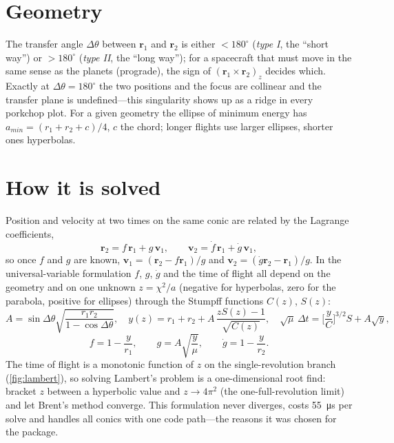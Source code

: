 \documentclass[11pt,letterpaper,oneside]{report}
\newcommand{\bv}[1]{\bm{#1}}
\begin{document}
\section{Geometry}
The transfer angle $\Delta\theta$ between $\bv r_1$ and $\bv r_2$ is either $<180^\circ$
(\emph{type I}, the ``short way'') or $>180^\circ$ (\emph{type II}, the ``long way''); for a
spacecraft that must move in the same sense as the planets (prograde), the sign of
$(\bv r_1\times\bv r_2)_z$ decides which. Exactly at $\Delta\theta=180^\circ$ the two positions and
the focus are collinear and the transfer plane is undefined---this singularity shows up as a
ridge in every porkchop plot. For a given geometry the ellipse of minimum energy has
$a_{min}=(r_1+r_2+c)/4$, $c$ the chord; longer flights use larger ellipses, shorter ones
hyperbolas.

\section{How it is solved}
Position and velocity at two times on the same conic are related by the Lagrange coefficients,
\begin{equation}
  \bv r_2=f\,\bv r_1+g\,\bv v_1,\qquad \bv v_2=\dot f\,\bv r_1+\dot g\,\bv v_1,
\end{equation}
so once $f$ and $g$ are known, $\bv v_1=(\bv r_2-f\bv r_1)/g$ and $\bv v_2=(\dot g\bv r_2-\bv r_1)/g$.
In the universal-variable formulation $f$, $g$, $\dot g$ and the time of flight all depend on
the geometry and on one unknown $z=\chi^2/a$ (negative for hyperbolas, zero for the parabola,
positive for ellipses) through the Stumpff functions $C(z)$, $S(z)$:
\begin{equation}
  A=\sin\Delta\theta\sqrt{\frac{r_1r_2}{1-\cos\Delta\theta}},\quad
  y(z)=r_1+r_2+A\,\frac{zS(z)-1}{\sqrt{C(z)}},\quad
  \sqrt\mu\,\Delta t=\Big[\frac{y}{C}\Big]^{3/2}S+A\sqrt y ,
  \label{eq:lambert}
\end{equation}
\begin{equation}
  f=1-\frac{y}{r_1},\qquad g=A\sqrt{\frac{y}{\mu}},\qquad \dot g=1-\frac{y}{r_2}.
\end{equation}
The time of flight is a monotonic function of $z$ on the single-revolution branch
(\cref{fig:lambert}), so solving Lambert's problem is a one-dimensional root find: bracket $z$
between a hyperbolic value and $z\to4\pi^2$ (the one-full-revolution limit) and let Brent's method
converge. This formulation never diverges, costs \SI{55}{\micro s} per solve and handles all conics
with one code path---the reasons it was chosen for the package.
\end{document}
